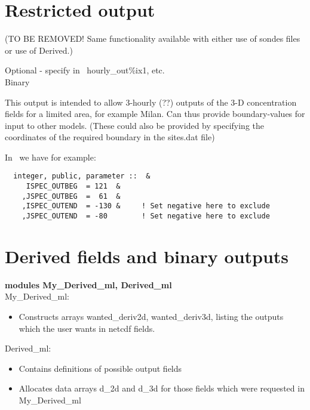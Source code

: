 \section{Restricted output}
(TO BE REMOVED! Same functionality available with either use of
sondes files or use of Derived.)

\noindent
Optional -  specify in \MyOutputs\, hourly\_out\%ix1, etc.\\
Binary
\vspace{1cm}

This output is intended to allow 3-hourly (??) outputs of the 3-D concentration
fields for a limited area, for example Milan. Can thus provide boundary-values
for input to other models. (These could also be provided by specifying the
coordinates of the required boundary in the sites.dat file)

In \MyOutputs\ we have for example:

\begin{small}
\begin{verbatim}
  integer, public, parameter ::  &
	 ISPEC_OUTBEG  = 121  &
	,JSPEC_OUTBEG  =  61  &
	,ISPEC_OUTEND  = -130 &     ! Set negative here to exclude
	,JSPEC_OUTEND  = -80        ! Set negative here to exclude
\end{verbatim}
\end{small}


\section{Derived fields and binary outputs}

{\bf modules My\_Derived\_ml, Derived\_ml}\\

My\_Derived\_ml:\\
\begin{itemize}
  \item Constructs arrays wanted\_deriv2d, wanted\_deriv3d, listing
   the outputs which the user wants in netcdf fields.
\end{itemize}

Derived\_ml:\\
\begin{itemize}
  \item Contains definitions of possible output fields
  \item Allocates data arrays d\_2d and d\_3d for those
    fields which were requested in My\_Derived\_ml	
\end{itemize}



